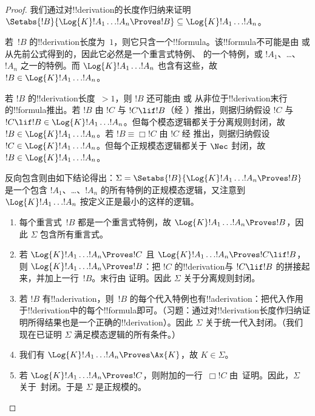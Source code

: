 \documentclass[../../../include/open-logic-section]{subfiles}
\begin{document}
\begin{proof}
  我们通过对!!{derivation}的长度作归纳来证明
  $\Setabs{!B}{\Log{K} !A_1 \dots !A_n \Proves !B} \subseteq
  \Log{K} !A_1 \dots !A_n$。

  若~$!B$ 的!!{derivation}长度为~$1$，则它只含一个!!{formula}。该!!{formula}不可能是由 \MP{} 或 \Nec 从先前公式得到的，因此它必然是一个重言式特例、 的一个特例，或 $!A_1$、\dots、~$!A_n$ 之一的特例。而 $\Log{K}!A_1\dots!A_n$ 也含有这些，故 $!B \in \Log{K}!A_1 \dots !A_n$。

  若 $!B$ 的!!{derivation}长度~$> 1$，则 $!B$ 还可能由 \MP{} 或 \Nec{} 从非位于!!{derivation}末行的!!{formula}推出。若 $!B$ 由 $!C$ 与 $!C \lif !B$（经 \MP）推出，则据归纳假设 $!C$ 与 $!C \lif !B \in
  \Log{K}!A_1 \dots !A_n$。但每个模态逻辑都关于分离规则封闭，故 $!B \in \Log{K}!A_1 \dots
  !A_n$。若 $!B \equiv \Box !C$ 由 $!C$ 经 \Nec 推出，则据归纳假设 $!C
  \in \Log{K}!A_1 \dots !A_n$。但每个正规模态逻辑都关于 $\Nec$ 封闭，故 $!B \in
  \Log{K}!A_1\dots!A_n$。

  反向包含则由如下结论得出：$\Sigma = \Setabs{!B}{\Log{K} !A_1 \dots !A_n \Proves !B }$ 是一个包含 $!A_1$、\dots、$!A_n$ 的所有特例的正规模态逻辑，又注意到 $\Log{K} !A_1 \dots !A_n$ 按定义正是最小的这样的逻辑。
  \begin{enumerate}
    \item 每个重言式~$!B$ 都是一个重言式特例，故
      $\Log{K}!A_1\dots!A_n \Proves !B$，因此 $\Sigma$ 包含所有重言式。
    \item 若 $\Log{K}!A_1\dots!A_n \Proves !C$ 且
      $\Log{K}!A_1\dots!A_n \Proves !C \lif !B$，则
      $\Log{K}!A_1\dots!A_n \Proves !B$：把 $!C$ 的!!{derivation}与 $!C \lif !B$ 的拼接起来，并加上一行~$!B$。末行由 \MP{} 证明。因此 $\Sigma$ 关于分离规则封闭。
    \item 若 $!B$ 有!!a{derivation}，则~$!B$ 的每个代入特例也有!!a{derivation}：把代入作用于!!{derivation}中的每个!!{formula}即可。（习题：通过对!!{derivation}长度作归纳证明所得结果也是一个正确的!!{derivation}）。因此 $\Sigma$ 关于统一代入封闭。（我们现在已证明 $\Sigma$ 满足模态逻辑的所有条件。）
    \item 我们有 $\Log{K}!A_1\dots!A_n \Proves \Ax{K}$，故 $K \in \Sigma$。
    \item 若 $\Log{K}!A_1\dots!A_n \Proves !C$，则附加的一行~$\Box !C$ 由~\Nec 证明。因此，$\Sigma$ 关于~\Nec 封闭。于是 $\Sigma$ 是正规模的。
  \end{enumerate}
\end{proof}
\end{document}
